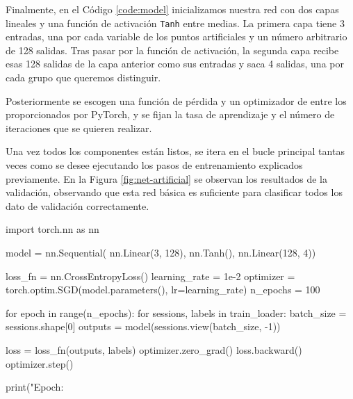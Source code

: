 Finalmente, en el Código \ref{code:model} inicializamos nuestra red con dos capas lineales y una función de activación \texttt{Tanh} entre medias. La primera capa tiene 3 entradas, una por cada variable de los puntos artificiales y un número arbitrario de 128 salidas. Tras pasar por la función de activación, la segunda capa recibe esas 128 salidas de la capa anterior como sus entradas y saca 4 salidas, una por cada grupo que queremos distinguir.

Posteriormente se escogen una función de pérdida y un optimizador de entre los proporcionados por PyTorch, y se fijan la tasa de aprendizaje y el número de iteraciones que se quieren realizar.

Una vez todos los componentes están listos, se itera en el bucle principal tantas veces como se desee ejecutando los pasos de entrenamiento explicados previamente. En la Figura \ref{fig:net-artificial} se observan los resultados de la validación, observando que esta red básica es suficiente para clasificar todos los dato de validación correctamente.

\begin{mypython}[float={h}, caption={Modelo de la red y enrenamiento con los datos artificiales.}, label={code:model}]
import torch.nn as nn

model = nn.Sequential(
  nn.Linear(3, 128),
  nn.Tanh(),
  nn.Linear(128, 4))

loss_fn = nn.CrossEntropyLoss()
learning_rate = 1e-2
optimizer = torch.optim.SGD(model.parameters(),     
                            lr=learning_rate)
n_epochs = 100

for epoch in range(n_epochs):
  for sessions, labels in train_loader:
    batch_size = sessions.shape[0]
    outputs = model(sessions.view(batch_size, -1))

    loss = loss_fn(outputs, labels)
    optimizer.zero_grad()
    loss.backward()
    optimizer.step()
  
  print("Epoch: %
\end{mypython}


